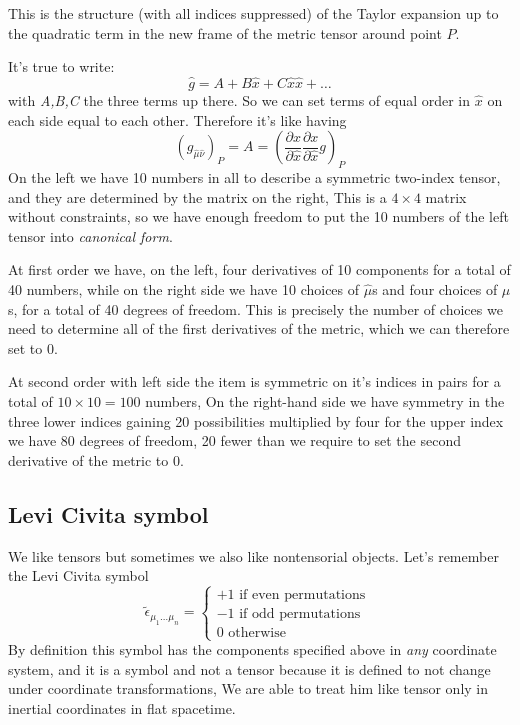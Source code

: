 This is the structure (with all indices suppressed) of the Taylor expansion up to the quadratic term in the new frame of the metric tensor around point $P$. \par
It's true to write:
\[
	\hat{g} = A+ B \hat{x} + C \hat{x}\hat{x} + \ldots 
\]
with \emph{A,B,C} the three terms up there. So we can set terms of equal order in $\hat{x}$ on each side equal to each other. Therefore it's like having
\[
	\left( g_{\hat{\mu }\hat{\nu }} \right)_{P} = A = \left( \frac{\partial x}{\partial \hat{x}} \frac{\partial x}{\partial \hat{x}} g  \right)_{P}
\]
On the left we have 10 numbers in all to describe a symmetric two-index tensor, and they are determined by the matrix on the right, This is a $4\times 4$ matrix without constraints, so we have enough freedom to put the 10 numbers of the left tensor into \emph{canonical form}.\par
At first order we have, on the left, four derivatives of 10 components for a total of 40 numbers, while on the right side we have 10 choices of $\hat{\mu }$s and four choices of $\mu$s, for a total of 40 degrees of freedom. This is precisely the number of choices we need to determine all of the first derivatives of the metric, which we can therefore set to 0. \par
At second order with left side the item is symmetric on it's indices in pairs for a total of $10 \times 10 = 100$ numbers, On the right-hand side we have symmetry in the three lower indices gaining 20 possibilities multiplied by four for the upper index we have 80 degrees of freedom, 20 fewer than we require to set the second derivative of the metric to 0.\par

\subsection{Levi Civita symbol}
We like tensors but sometimes we also like nontensorial objects.
Let's remember the Levi Civita symbol 
\[
	\tilde{\epsilon}_{\mu _{1}\ldots \mu _{n }} = \begin{cases}
	+1 \text{ if even permutations } \\
	-1 \text{ if odd permutations } \\
	0 \text{ otherwise }
	\end{cases}	
\]
By definition this symbol has the components specified above in \emph{any} coordinate system, and it is a symbol and not a tensor because it is defined to not change under coordinate transformations, We are able to treat him like tensor only in inertial coordinates in flat spacetime.

